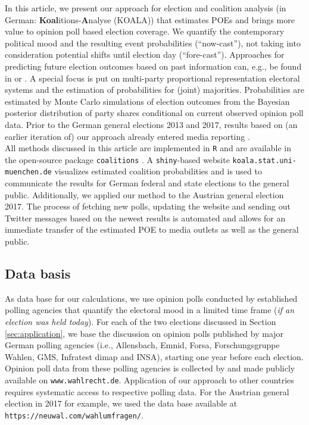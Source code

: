 \documentclass[smallcondensed]{svjour3}     %
\begin{document}
In this article, we present our approach for election and coalition analysis
(in German: \textbf{Koal}itions-\textbf{A}nalyse (KOALA)) that estimates POEs
and brings more value to opinion poll based election
coverage. We quantify the contemporary political mood
and the resulting event probabilities (``now-cast''), not taking into consideration
potential shifts until election day (``fore-cast''). Approaches for predicting
future election outcomes based on past information can, e.g., be found in
\citet{graefe_2017} or \citet{norpoth_gschwend_2010}. A special focus is put on
multi-party proportional representation electoral systems and the estimation
of probabilities for (joint) majorities. Probabilities are estimated by Monte Carlo
simulations of election outcomes from the Bayesian posterior distribution of party
shares conditional on current observed opinion poll data. Prior to the German general
elections 2013 and 2017, results based on (an earlier iteration of) our approach
already entered media reporting \citep[cf.][]{wahlistik_2013, gelitz_2017}.\\

All methods discussed in this article are implemented in \texttt{R} \citep{r_2017}
and are available in the open-source package \texttt{coalitions} \citep{bender_bauer_2018}.
A \texttt{shiny}-based \citep{chang_2017} website
\texttt{koala.stat.uni-\allowbreak muenchen.\allowbreak de} visualizes estimated
coalition probabilities and is used to communicate the results for German federal
and state elections to the general public. Additionally, we applied our method
to the Austrian general election 2017. The process of fetching new polls,
updating the website and sending out Twitter messages based on the newest results
is automated and allows for an immediate transfer of the estimated POE
to media outlets as well as the general public.

\subsection{Data basis}\label{ssec:data-basis}
As data base for our calculations, we use opinion polls conducted by established
polling agencies that quantify the electoral mood in a limited time frame
(\textit{if an election was held today}). For each of the two elections discussed
in Section \ref{sec:application}, we base the discussion on opinion polls published
by major German polling agencies (i.e., Allensbach, Emnid, Forsa, Forschungsgruppe Wahlen,
GMS, Infratest dimap and INSA), starting one year before each election.
Opinion poll data from these polling agencies is collected by and made publicly available
on \texttt{www.wahlrecht.de}. Application of our approach to other countries
requires systematic access to respective polling data. For the Austrian general
election in 2017 for example, we used the data base available at
\texttt{https://neuwal.com/wahlumfragen/}.
\end{document}
